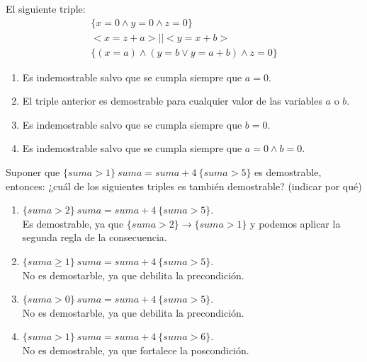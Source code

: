 \begin{ejercicio}
    El siguiente triple:
    \begin{gather*}
        \{x=0 \land y = 0 \land z = 0\} \\
        <x = z + a> || <y = x+b> \\
        \{(x = a) \land (y = b \lor y = a +b) \land z = 0\}
    \end{gather*}
    \begin{enumerate}[label=(\alph*)]
        \item Es indemostrable salvo que se cumpla siempre que $a=0$.
        \item El triple anterior es demostrable para cualquier valor de las variables $a$ o $b$.
        \item Es indemostrable salvo que se cumpla siempre que $b = 0$.
        \item Es indemostrable salvo que se cumpla siempre que $a = 0 \land b = 0$.
    \end{enumerate}
\end{ejercicio}

\begin{ejercicio}
    Suponer que $\{suma>1\}\ suma=suma+4\ \{suma>5\}$ es demostrable, entonces: ¿cuál de los siguientes triples es también demostrable? (indicar por qué)
    \begin{enumerate}[label=(\alph*)]
        \item $\{suma>2\}\ suma=suma+4\ \{suma>5\}$.\\
            Es demostrable, ya que $\{suma>2\}\rightarrow\{suma>1\}$ y podemos aplicar la segunda regla de la consecuencia.
        \item $\{suma\geq 1\}\ suma=suma+4\ \{suma > 5\}$.\\
            No es demostarble, ya que debilita la precondición.
        \item $\{suma>0\}\ suma=suma+4\ \{suma > 5\}$.\\
            No es demostarble, ya que debilita la precondición.
        \item $\{suma>1\}\ suma=suma+4\ \{suma > 6\}$.\\
            No es demostrable, ya que fortalece la poscondición.
    \end{enumerate}
\end{ejercicio}


